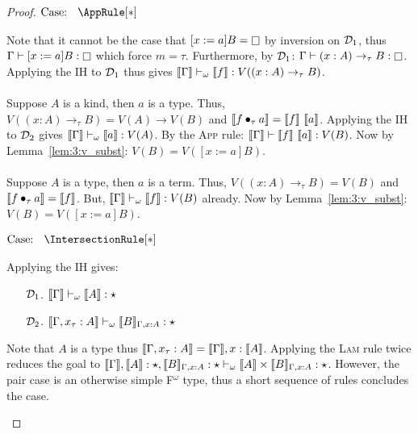 \begin{proof}
    $\text{Case: }\begin{array}{c} \AppRule[*] \end{array}$
    \begin{proofcase}
        Note that it cannot be the case that $[x := a]B = \kind$ by inversion on $\mathcal{D}_{1}$, thus $\Gamma \vdash [x := a]B : \kind$ which force $m = \tau$.
        Furthermore, by $\mathcal{D}_{1}$: $\Gamma \vdash (x : A) \to_\tau B : \kind$.
        Applying the IH to $\mathcal{D}_{1}$ thus gives $\llbracket \Gamma \rrbracket \vdash_\omega \llbracket f \rrbracket : V((x : A) \to_\tau B)$.
        \\ \\
        Suppose $A$ is a kind, then $a$ is a type.
        Thus, $V((x : A) \to_\tau B) = V(A) \to V(B)$ and $\sema{\app{f}{\tau}{a}} = \sema{f}\ \sema{a}$.
        Applying the IH to $\mathcal{D}_{2}$ gives $\llbracket \Gamma \rrbracket \vdash_\omega \llbracket a \rrbracket : V(A)$.
        By the \textsc{App} rule: $\llbracket \Gamma \rrbracket \vdash \llbracket f \rrbracket\ \llbracket a \rrbracket : V(B)$.
        Now by Lemma~\ref{lem:3:v_subst}: $V(B) = V([x := a]B)$.
        \\ \\
        Suppose $A$ is a type, then $a$ is a term.
        Thus, $V((x : A) \to_\tau B) = V(B)$ and $\llbracket f \bullet_{\tau} a \rrbracket = \llbracket f \rrbracket$.
        But, $\llbracket \Gamma \rrbracket \vdash_\omega \llbracket f \rrbracket : V(B)$ already.
        Now by Lemma~\ref{lem:3:v_subst}: $V(B) = V([x := a]B)$.
    \end{proofcase}

    $\text{Case: }\begin{array}{c} \IntersectionRule[*] \end{array}$
    \begin{proofcase}
        Applying the IH gives:
        \begin{enumerate}
            \item[$\mathcal{D}_{1}$.] $\llbracket \Gamma \rrbracket \vdash_\omega \llbracket A \rrbracket : \star$
            \item[$\mathcal{D}_{2}$.] $\llbracket \Gamma, x_\tau : A \rrbracket \vdash_\omega \llbracket B \rrbracket_{\Gamma, x:A} : \star$ 
        \end{enumerate}
        Note that $A$ is a type thus $\llbracket \Gamma, x_\tau : A \rrbracket = \llbracket \Gamma \rrbracket, x : \llbracket A \rrbracket$.
        Applying the \textsc{Lam} rule twice reduces the goal to $\llbracket \Gamma \rrbracket, \llbracket A \rrbracket : \star, \llbracket B \rrbracket_{\Gamma,x:A} : \star \vdash_\omega \llbracket A \rrbracket \times \llbracket B \rrbracket_{\Gamma,x:A} : \star$.
        However, the pair case is an otherwise simple F$^\omega$ type, thus a short sequence of rules concludes the case.
    \end{proofcase}


\end{proof}
